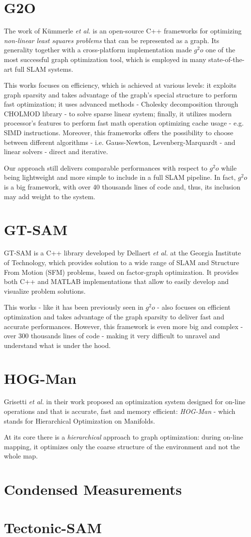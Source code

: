 \section{G2O}
The work of K\"ummerle \textit{et al.} \cite{kummerle2011g} is an open-source C++ frameworks for optimizing \textit{non-linear least squares problems} that can be represented as a graph. Its generality together with a cross-platform implementation made $g^2o$ one of the most successful graph optimization tool, which is employed in many state-of-the-art full SLAM systems. 

This works focuses on efficiency, which is achieved at various levels: it exploits graph sparsity and takes advantage of the graph's special structure to perform fast optimization; it uses advanced methods - Cholesky decomposition through CHOLMOD library - to solve sparse linear system; finally, it utilizes modern processor's features to perform fast math operation optimizing cache usage - e.g. SIMD instructions. Moreover, this frameworks offers the possibility to choose between different algorithms - i.e. Gauss-Newton, Levenberg-Marquardt - and linear solvers - direct and iterative.

Our approach still delivers comparable performances with respect to $g^2o$ while being lightweight and more simple to include in a full SLAM pipeline. In fact, $g^2o$ is a big framework, with over 40 thousands lines of code and, thus, its inclusion may add weight to the system.

\section{GT-SAM}
GT-SAM is a C++ library developed by Dellaert \textit{et al.} \cite{dellaert2012gtsam} at the Georgia Institute of Technology, which provides solution to a wide range of SLAM and Structure From Motion (SFM) problems, based on factor-graph optimization. It provides both C++ and MATLAB implementations that allow to easily develop and visualize problem solutions. 

This works - like it has been previously seen in $g^2o$ - also focuses on efficient optimization and takes advantage of the graph sparsity to deliver fast and accurate performances. However, this framework is even more big and complex - over 300 thousands lines of code - making it very difficult to unravel and understand what is under the hood.

\section{HOG-Man}
Grisetti \textit{et al.} in their work \cite{grisetti2010hogman} proposed an optimization system designed for on-line operations and that is accurate, fast and memory efficient: \textit{HOG-Man} - which stands for Hierarchical Optimization on Manifolds.

At its core there is a \textit{hierarchical} approach to graph optimization: during on-line mapping, it optimizes only the coarse structure of the environment and not the whole map.

\section{Condensed Measurements}
\lipsum[1-2]

\section{Tectonic-SAM}
\lipsum[1-2]

